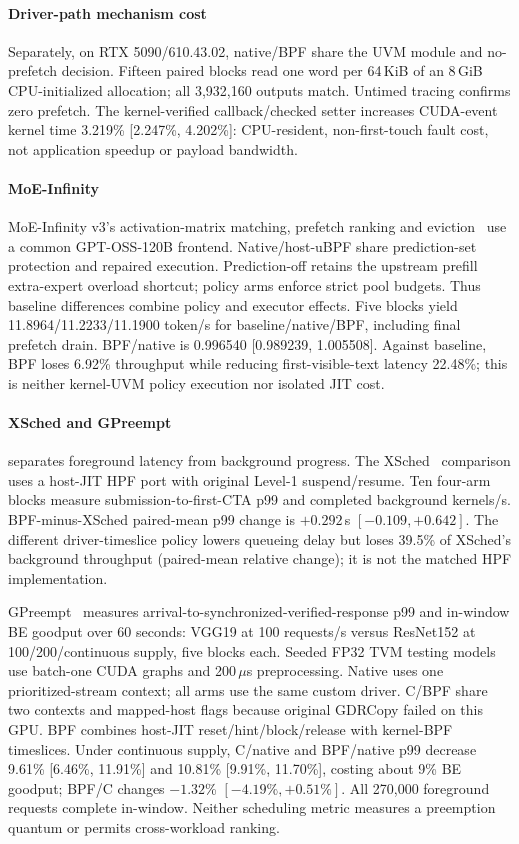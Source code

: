 \paragraph{Driver-path mechanism cost}
Separately, on RTX 5090/610.43.02, native/BPF share the UVM module and no-prefetch decision.
Fifteen paired blocks read one word per 64\,KiB of an 8\,GiB CPU-initialized
allocation; all 3,932,160 outputs match. Untimed tracing confirms zero prefetch.
The kernel-verified callback/checked setter increases CUDA-event kernel time
3.219\% [2.247\%, 4.202\%]: CPU-resident, non-first-touch fault cost, not
application speedup or payload bandwidth.

\paragraph{MoE-Infinity}
MoE-Infinity v3's activation-matrix matching, prefetch ranking and eviction~\cite{xue2025moeinfinity}
use a common GPT-OSS-120B frontend. Native/host-uBPF share prediction-set protection
and repaired execution. Prediction-off retains the upstream prefill extra-expert
overload shortcut; policy arms enforce strict pool budgets. Thus baseline
differences combine policy and executor effects. Five blocks yield
11.8964/11.2233/11.1900 token/s for baseline/native/BPF, including final prefetch
drain. BPF/native is 0.996540 [0.989239, 1.005508]. Against baseline, BPF loses
6.92\% throughput while reducing first-visible-text latency 22.48\%; this is
neither kernel-UVM policy execution nor isolated JIT cost.

\paragraph{XSched and GPreempt}
 separates foreground latency from background
progress. The XSched~\cite{shen2025xsched} comparison uses a host-JIT HPF port
with original Level-1 suspend/resume. Ten four-arm blocks measure submission-to-first-CTA
p99 and completed background kernels/s. BPF-minus-XSched paired-mean p99 change is
$+0.292$\,s $[-0.109,+0.642]$. The different driver-timeslice policy lowers
queueing delay but loses 39.5\% of XSched's background throughput (paired-mean relative
change); it is not the matched HPF implementation.

GPreempt~\cite{fan2025gpreempt} measures arrival-to-synchronized-verified-response
p99 and in-window BE goodput over 60 seconds: VGG19 at 100 requests/s versus
ResNet152 at 100/200/continuous supply, five blocks each. Seeded FP32 TVM testing
models use batch-one CUDA graphs and 200\,$\mu$s preprocessing. Native uses one
prioritized-stream context; all arms use the same custom driver. C/BPF share two contexts and mapped-host flags
because original GDRCopy failed on this GPU. BPF combines host-JIT reset/hint/block/release
with kernel-BPF timeslices. Under continuous supply, C/native and BPF/native
p99 decrease 9.61\% [6.46\%, 11.91\%] and 10.81\% [9.91\%, 11.70\%], costing
about 9\% BE goodput; BPF/C changes $-1.32$\% $[-4.19\%,+0.51\%]$.
All 270,000 foreground requests complete in-window. Neither scheduling metric
measures a preemption quantum or permits cross-workload ranking.

